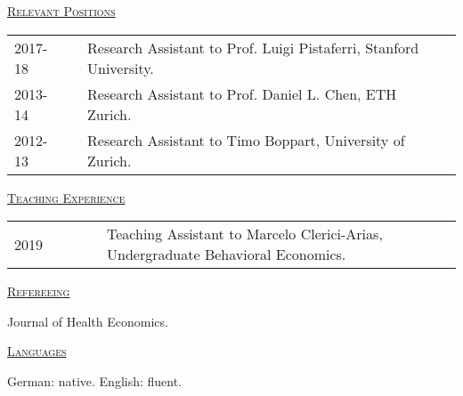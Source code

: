 \documentclass[letterpaper,11pt]{article}
\begin{document}
\underline {\textsc{Relevant Positions}}

\begin{tabular}{@{}l@{}cl@{}cl}
2017-18 & & Research Assistant to Prof. Luigi Pistaferri, Stanford University. \\
2013-14 & & Research Assistant to Prof. Daniel L. Chen, ETH Zurich. \\
2012-13 & & Research Assistant to Timo Boppart, University of Zurich.
\end{tabular}

\bigskip
 
\underline {\textsc{Teaching Experience}}

\begin{tabular}{@{}l@{}cl@{}cl}
2019 & \ \ \ \ \ & Teaching Assistant to Marcelo Clerici-Arias, Undergraduate Behavioral Economics.
\end{tabular}

\bigskip
 
\underline {\textsc{Refereeing}}

Journal of Health Economics.

\bigskip
 
\underline {\textsc{Languages}}

German: native. English: fluent.
\end{document}
